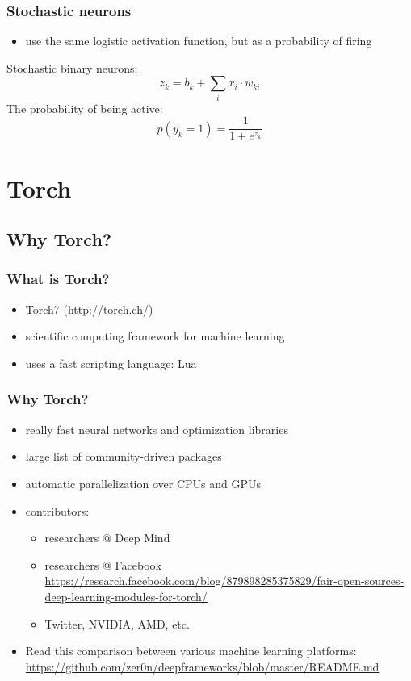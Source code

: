 \begin{frame}
  \frametitle{Stochastic neurons}
  \begin{itemize}
  \item use the same logistic activation function, but as a
    probability of firing
  \end{itemize}
  \begin{definition}
    Stochastic binary neurons:
    \begin{equation}
      \label{eq:stochastic-neuron-1}
      z_k = b_k + \displaystyle\sum_{i}x_i\cdot w_{ki}
    \end{equation}
    The probability of being active:
    \begin{equation}
      \label{eq:logistic-neuron-2}
      p(y_k = 1) = \frac{1}{1 + e^{z_k}}
    \end{equation}
  \end{definition}
\end{frame}

\section{Torch}
\label{sec:torch}

\subsection{Why Torch?}
\label{sec:why_torch}

\begin{frame}
  \frametitle{What is Torch?}
  \begin{itemize}
  \item Torch7 (\url{http://torch.ch/})
  \item scientific computing framework for machine learning
  \item uses a fast scripting language: Lua
  \end{itemize}
\end{frame}

\begin{frame}
  \frametitle{Why Torch?}
  \begin{itemize}
  \item really fast neural networks and optimization libraries
  \item large list of community-driven packages
  \item automatic parallelization over CPUs and GPUs
  \item contributors:
    \begin{itemize}
    \item researchers @ Deep Mind
    \item researchers @ Facebook
      \url{https://research.facebook.com/blog/879898285375829/fair-open-sources-deep-learning-modules-for-torch/}
    \item Twitter, NVIDIA, AMD, etc.
    \end{itemize}
    \vfill
  \item Read this comparison between various machine learning platforms: {\scriptsize \url{https://github.com/zer0n/deepframeworks/blob/master/README.md}}
  \end{itemize}
\end{frame}

